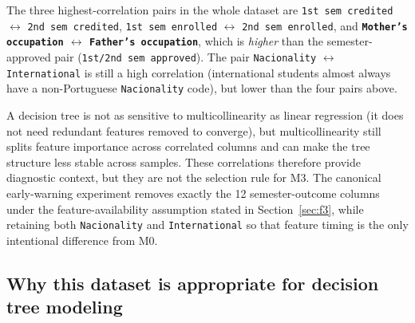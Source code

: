 The three highest-correlation pairs in the whole dataset are
\texttt{1st sem credited} $\leftrightarrow$ \texttt{2nd sem credited},
\texttt{1st sem enrolled} $\leftrightarrow$ \texttt{2nd sem enrolled},
and \textbf{\texttt{Mother's occupation} $\leftrightarrow$
\texttt{Father's occupation}}, which is \emph{higher} than the
semester-approved pair (\texttt{1st/2nd sem approved}). The pair
\texttt{Nacionality} $\leftrightarrow$ \texttt{International} is still a
high correlation (international students almost always have a
non-Portuguese \texttt{Nacionality} code), but lower than the four
pairs above.

A decision tree is not as sensitive to multicollinearity as linear
regression (it does not need redundant features removed to converge),
but multicollinearity still splits feature importance across correlated
columns and can make the tree structure less stable across samples. These
correlations therefore provide diagnostic context, but they are not the
selection rule for M3. The canonical early-warning experiment removes
exactly the 12 semester-outcome columns under the feature-availability
assumption stated in Section~\ref{sec:f3}, while retaining both \texttt{Nacionality} and
\texttt{International} so that feature timing is the only intentional
difference from M0.

\subsection{Why this dataset is appropriate for decision tree modeling}

